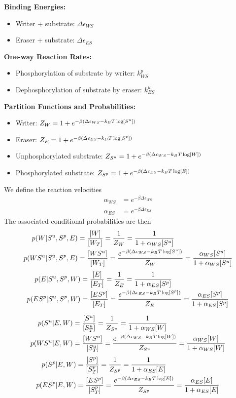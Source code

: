\documentclass[aps,onecolumn,superscriptaddress,notitlepage]{revtex4-1}
\begin{document}
\textbf{Binding Energies:}
\begin{itemize}
\item Writer + substrate: $\Delta\epsilon_{WS}$
\item Eraser + substrate: $\Delta\epsilon_{ES}$
\end{itemize}

\textbf{One-way Reaction Rates:}
\begin{itemize}
\item Phosphorylation of substrate by writer: $k_{WS}^p$
\item Dephosphorylation of substrate by eraser: $k_{ES}^u$
\end{itemize}

\textbf{Partition Functions and Probabilities:}
\begin{itemize}
\item Writer: $Z_W = 1 + e^{-\beta\qty(\Delta\epsilon_{WS} -k_BT \log[S^u])}$
\item Eraser: $Z_E = 1 + e^{-\beta\qty(\Delta\epsilon_{ES} -k_BT \log[S^p])}$
\item Unphosphorylated substrate: $Z_{S^u} = 1 + e^{-\beta\qty(\Delta\epsilon_{WS} -k_BT \log[W])}$
\item Phosphorylated substrate: $Z_{S^p} = 1 + e^{-\beta\qty(\Delta\epsilon_{ES} -k_BT \log[E])}$
\end{itemize}
We define the reaction velocities
\begin{align}
\alpha_{WS} &= e^{-\beta\Delta\epsilon_{WS}}\\
\alpha_{ES} &= e^{-\beta\Delta\epsilon_{ES}}
\end{align}
The associated conditional probabilities are then
\begin{align}
p(W|S^u,S^p, E) &= \frac{[W]}{[W_T]} = \frac{1}{Z_W} =  \frac{1}{1 + \alpha_{WS}[S^u]}\\
p(WS^u|S^u,S^p, E) &= \frac{[WS^u]}{[W_T]}  = \frac{e^{-\beta\qty(\Delta\epsilon_{WS} -k_BT \log[S^u])}}{Z_W} =  \frac{\alpha_{WS}[S^u]}{1 + \alpha_{WS}[S^u]}
\end{align}
\begin{align}
p(E|S^u,S^p, W) &= \frac{[E]}{[E_T]} = \frac{1}{Z_E} =  \frac{1}{1 + \alpha_{ES}[S^p]}\\
p(ES^p|S^u,S^p, W) &= \frac{[ES^p]}{[E_T]}  = \frac{e^{-\beta\qty(\Delta\epsilon_{ES} -k_BT \log[S^p])}}{Z_E} =  \frac{\alpha_{ES}[S^p]}{1 + \alpha_{ES}[S^p]}
\end{align}

\begin{align}
p(S^u|E, W) &= \frac{[S^u]}{[S^u_T]} = \frac{1}{Z_{S^u}} = \frac{1}{1 + \alpha_{WS}[W]}\\
p(WS^u|E, W) &= \frac{[WS^u]}{[S^u_T]} = \frac{ e^{-\beta\qty(\Delta\epsilon_{WS} -k_BT \log[W])}}{Z_{S^u}} = \frac{\alpha_{WS}[W]}{1 + \alpha_{WS}[W]}
\end{align}
\begin{align}
p(S^p|E, W) &= \frac{[S^p]}{[S^p_T]} = \frac{1}{Z_{S^p}} = \frac{1}{1 + \alpha_{ES}[E]}\\
p(ES^p|E, W) &= \frac{[ES^p]}{[S^p_T]} = \frac{ e^{-\beta\qty(\Delta\epsilon_{ES} -k_BT \log[E])}}{Z_{S^p}} = \frac{\alpha_{ES}[E]}{1 + \alpha_{ES}[E]}
\end{align}
\end{document}

